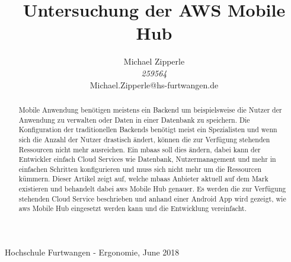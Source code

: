 \documentclass[journal]{IEEEtran}
\begin{document}
\title{Untersuchung der AWS Mobile Hub}

\author{\begin{center}
 Michael Zipperle \\ 
 \textit{259564} \\
 Michael.Zipperle@hs-furtwangen.de \\
\end{center}}%
        
%
{Hochschule Furtwangen - Ergonomie, June 2018}

\maketitle


\begin{abstract}
Mobile Anwendung benötigen meistens ein Backend um beispielsweise die Nutzer der Anwendung zu verwalten oder Daten in einer Datenbank zu speichern. Die Konfiguration der traditionellen Backends benötigt meist ein Spezialisten und wenn sich die Anzahl der Nutzer drastisch ändert, können die zur Verfügung stehenden Ressourcen nicht mehr ausreichen. Ein \gls{mbaas} soll dies ändern, dabei kann der Entwickler einfach Cloud Services wie Datenbank, Nutzermanagement und mehr in einfachen Schritten konfigurieren und muss sich nicht mehr um die Ressourcen kümmern. Dieser Artikel zeigt auf, welche \gls{mbaas} Anbieter aktuell auf dem Mark existieren und behandelt dabei \gls{aws} Mobile Hub genauer. Es werden die zur Verfügung stehenden Cloud Service beschrieben und anhand einer Android App wird gezeigt, wie \gls{aws} Mobile Hub eingesetzt werden kann und die Entwicklung vereinfacht.

\end{abstract}


\IEEEpeerreviewmaketitle









\end{document}
